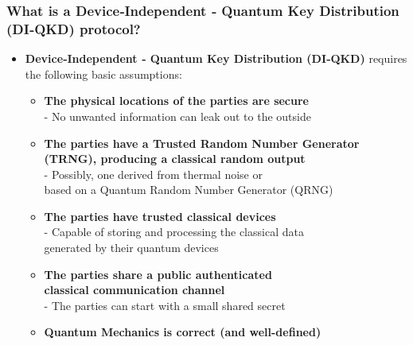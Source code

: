 \documentclass{beamer}
\begin{document}
		\begin{frame}
			\frametitle{\footnotesize What is a Device‑Independent ‑ Quantum Key Distribution (DI‑QKD) protocol?}

            \vspace{2.5ex}
            \begin{itemize}
                \item \textbf{Device‑Independent ‑ Quantum Key Distribution (DI‑QKD)} requires the following basic assumptions:
                \begin{itemize}
                    \normalsize
                    \item \textbf{The physical locations of the parties are secure}\\
                    \small
                    - No unwanted information can leak out to the outside
                    \normalsize
                    \item \textbf{The parties have a Trusted Random Number Generator (TRNG), producing a classical random output}\\
                    \small
                    - Possibly, one derived from thermal noise or \\\hspace{0.5em}based on a Quantum Random Number Generator (QRNG)
                    \normalsize
                    \item \textbf{The parties have trusted classical devices}\\
                    \small
                    - Capable of storing and processing the classical data\\\hspace{0.5em}generated by their quantum devices
                    \normalsize
                    \item \textbf{The parties share a public authenticated\\ classical communication channel}\\
                    \small
                    - The parties can start with a small shared secret
                    \normalsize
                    \item \textbf{Quantum Mechanics is correct (and well-defined)}
                \end{itemize}
            \end{itemize}
		\end{frame}
\end{document}
